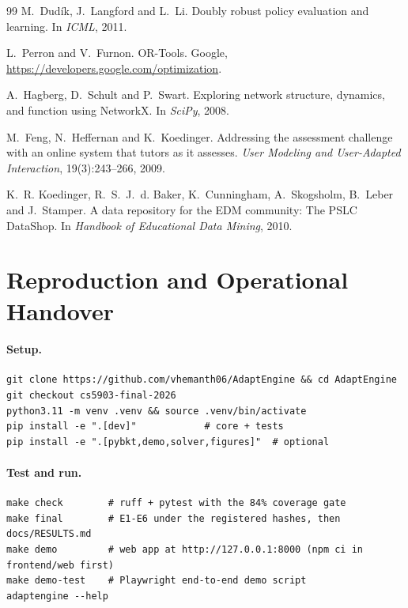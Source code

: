 \documentclass[11pt,a4paper]{article}
\begin{document}
\begin{thebibliography}{99}
 M.~Dud\'ik, J.~Langford and L.~Li. Doubly robust policy evaluation and learning. In \emph{ICML}, 2011.

 L.~Perron and V.~Furnon. OR-Tools. Google, \url{https://developers.google.com/optimization}.

 A.~Hagberg, D.~Schult and P.~Swart. Exploring network structure, dynamics, and function using NetworkX. In \emph{SciPy}, 2008.

 M.~Feng, N.~Heffernan and K.~Koedinger. Addressing the assessment challenge with an online system that tutors as it assesses. \emph{User Modeling and User-Adapted Interaction}, 19(3):243--266, 2009.

 K.~R. Koedinger, R.~S.~J.~d. Baker, K.~Cunningham, A.~Skogsholm, B.~Leber and J.~Stamper. A data repository for the EDM community: The PSLC DataShop. In \emph{Handbook of Educational Data Mining}, 2010.

\end{thebibliography}

\appendix
\section{Reproduction and Operational Handover}

\paragraph{Setup.}
\begin{verbatim}
git clone https://github.com/vhemanth06/AdaptEngine && cd AdaptEngine
git checkout cs5903-final-2026
python3.11 -m venv .venv && source .venv/bin/activate
pip install -e ".[dev]"            # core + tests
pip install -e ".[pybkt,demo,solver,figures]"  # optional
\end{verbatim}

\paragraph{Test and run.}
\begin{verbatim}
make check        # ruff + pytest with the 84% coverage gate
make final        # E1-E6 under the registered hashes, then docs/RESULTS.md
make demo         # web app at http://127.0.0.1:8000 (npm ci in frontend/web first)
make demo-test    # Playwright end-to-end demo script
adaptengine --help
\end{verbatim}
\end{document}
